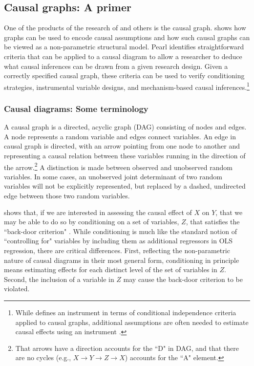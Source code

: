 \documentclass[11pt]{amsart}
\begin{document}
\subsection{Causal graphs: A primer}
One of the products of the research of \citet{Pearl:2009kh} and others is the causal graph.
\citet{Pearl:2009kh} shows how graphs can be used to encode causal assumptions and how such causal graphs can be viewed as a non-parametric structural model.
Pearl identifies straightforward criteria that can be applied to a causal diagram to allow a researcher to deduce what causal inferences can be drawn from a given research design.
Given a correctly specified causal graph, these criteria can be used to verify conditioning strategies, instrumental variable designs, and mechanism-based causal inferences.\footnote{While \citet[p.248]{Pearl:2009kh} defines an instrument in terms of conditional independence criteria applied to causal graphs, additional assumptions are often needed to estimate causal effects using an instrument \citep{Angrist:1996p7456}.}

\subsubsection{Causal diagrams: Some terminology}
A causal graph is a directed, acyclic graph (DAG) consisting of nodes and edges.
A node represents a random variable and edges connect variables.
An edge in causal graph is directed, with an arrow pointing from one node to another and representing a causal relation between these variables running in the direction of the arrow.\footnote{
That arrows have a direction accounts for the ``D" in DAG, and that there are no cycles (e.g., $X \rightarrow Y \rightarrow Z \rightarrow X$) accounts for the ``A" element.}
A distinction is made between observed and unobserved random variables.
In some cases, an unobserved joint determinant of two random variables will not be explicitly represented, but replaced by a dashed, undirected edge between those two random variables.

\citet{Pearl:2009kh} shows that, if we are interested in assessing the causal effect of $X$ on $Y$, that we may be able to do so by conditioning on a set of variables, $Z$, that satisfies the ``back-door criterion" \citep[p.79]{Pearl:2009kh}.
While conditioning is much like the standard notion of ``controlling for" variables by including them as additional regressors in OLS regression, there are critical differences.
First, reflecting the non-parametric nature of causal diagrams in their most general form, conditioning in principle means estimating effects for each distinct level of the set of variables in $Z$.
Second, the inclusion of a variable in $Z$ may cause the back-door criterion to be violated. 
\end{document}

